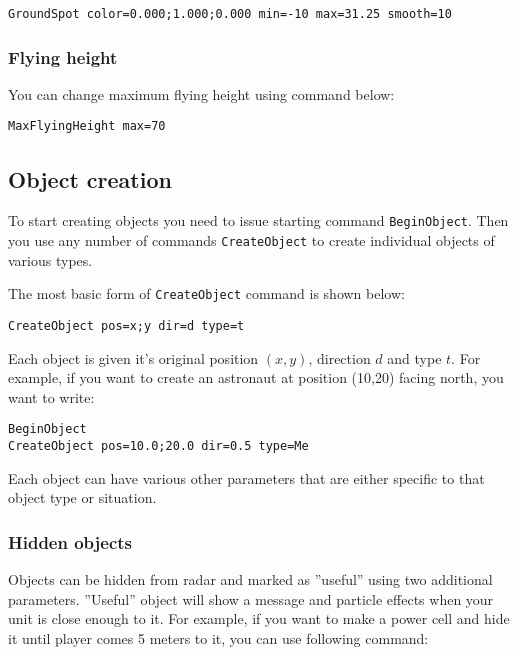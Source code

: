 \begin{lstlisting}[style=scene]
GroundSpot color=0.000;1.000;0.000 min=-10 max=31.25 smooth=10
\end{lstlisting}


\subsubsection{Flying height}

You can change maximum flying height using command below:

\begin{lstlisting}[style=scene]
MaxFlyingHeight max=70
\end{lstlisting}


\subsection{Object creation}

To start creating objects you need to issue starting command \texttt{BeginObject}. Then you use any number of commands \texttt{CreateObject} to create individual objects of various types.

The most basic form of \texttt{CreateObject} command is shown below:

\begin{lstlisting}[style=scene]
CreateObject pos=x;y dir=d type=t
\end{lstlisting}

Each object is given it's original position $(x, y)$, direction $d$ and type $t$. For example, if you want to create an astronaut at position (10,20) facing north, you want to write:

\begin{lstlisting}[style=scene]
BeginObject
CreateObject pos=10.0;20.0 dir=0.5 type=Me
\end{lstlisting}

Each object can have various other parameters that are either specific to that object type or situation.


\subsubsection{Hidden objects}

Objects can be hidden from radar and marked as ''useful'' using two additional parameters. ''Useful'' object will show a message and particle effects when your unit is close enough to it. For example, if you want to make a power cell and hide it until player comes 5 meters to it, you can use following command:

